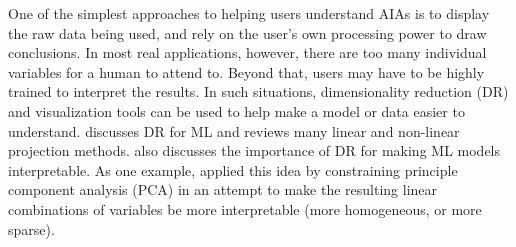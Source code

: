 One of the simplest approaches to helping users understand AIAs is to display the raw data being used, and rely on the user's own processing power to draw conclusions. In most real applications, however, there are too many individual variables for a human to attend to. Beyond that, users may have to be highly trained to interpret the results. In such situations, dimensionality reduction (DR) and visualization tools can be used to help make a model or data easier to understand. \citet{Venna2007-yj} discusses DR for ML and reviews many linear and non-linear projection methods. \citet{Vellido2012-nm} also discusses the importance of DR for making ML models interpretable. As one example, \citet{Chipman2005-om} applied this idea by constraining principle component analysis (PCA) in an attempt to make the resulting linear combinations of variables be more interpretable (more homogeneous, or more sparse).

